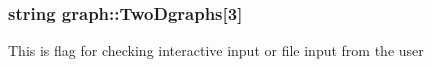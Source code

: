 \subsubsection[{\texorpdfstring{Two\+Dgraphs}{TwoDgraphs}}]{\setlength{\rightskip}{0pt plus 5cm}string graph\+::\+Two\+Dgraphs\mbox{[}3\mbox{]}}\hypertarget{namespacegraph_a718228685c9255e4d36f3f3c1294e607}{}\label{namespacegraph_a718228685c9255e4d36f3f3c1294e607}
This is flag for checking interactive input or file input from the user 